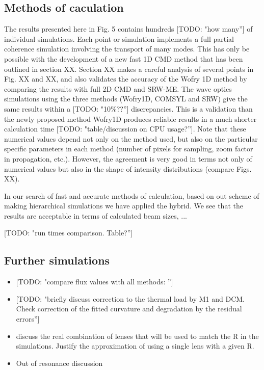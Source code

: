\documentclass{iucr}              %
\newcommand{\todo}[1]{{\color{red}[TODO: "#1'']}}
\newcommand{\inred}[1]{{\color{red}#1}}
\begin{document}
\subsection{Methods of caculation}

The results presented here in Fig. 5 contains hundreds \todo{how many} of individual simulations. Each point or simulation implements a full partial coherence simulation involving the transport of many modes. This has only be possible with the development of a new fast 1D CMD method that has been outlined in section XX. Section XX makes a careful analysis of several points in Fig. XX and XX, and also validates the accuracy of the Wofry 1D method by comparing the results with full 2D CMD and SRW-ME. 
The wave optics simulations using the three methods (Wofry1D, COMSYL and SRW) give the same results within a \todo{10\%??} discrepancies. This is a validation than the newly proposed method Wofry1D produces reliable results in a much shorter calculation time \todo{table/discussion on CPU usage?}. Note that these numerical values depend not only on the method used, but also on the particular specific parameters in each method (number of pixels for sampling, zoom factor in propagation, etc.). However, the agreement is very good in terms not only of numerical values but also in the shape of intensity distributions (compare Figs. XX).
 
\inred{In our search of fast and accurate methods of calculation, based on out scheme of making hierarchical simulations \cite{hierarchical} we have applied the hybrid. We see that the results are acceptable in terms of calculated beam sizes, ... }

\todo{run times comparison. Table?}

\subsection{Further simulations}

\begin{itemize}
    \item{\todo{compare flux values with all methods: }}
    
    \item \todo{briefly discuss correction to the thermal load by M1 and DCM. Check correction of the fitted curvature and degradation by the residual errors}
    
    \item discuss the real combination of lenses that will be used to match the R in the simulations. Justify the approximation of using a single lens with a given R. 
    
    \item Out of resonance discussion
    
\end{itemize}
\end{document}
